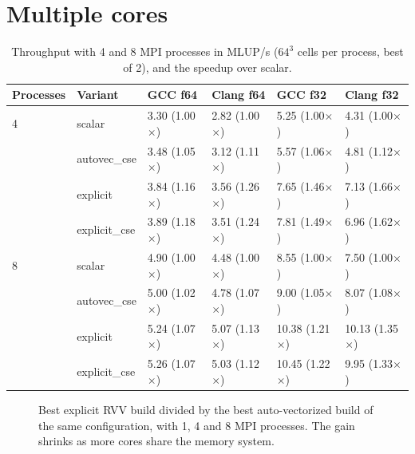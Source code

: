 \section{Multiple cores}\label{r02:sec:results-multi}

\begin{table}[htbp]
  \centering\small
  \caption{Throughput with 4 and 8 MPI processes in MLUP/s ($64^3$ cells per process,
    best of 2), and the speedup over scalar.}\label{r02:tab:multi}
  \begin{tabular}{@{}llllll@{}}
    \toprule
    \textbf{Processes} & \textbf{Variant} & \textbf{GCC f64} & \textbf{Clang f64} & \textbf{GCC f32} & \textbf{Clang f32}\\
    \midrule
    4 & scalar        & 3.30 (1.00$\times$) & 2.82 (1.00$\times$) & 5.25 (1.00$\times$) & 4.31 (1.00$\times$)\\
      & autovec\_cse  & 3.48 (1.05$\times$) & 3.12 (1.11$\times$) & 5.57 (1.06$\times$) & 4.81 (1.12$\times$)\\
      & explicit      & 3.84 (1.16$\times$) & 3.56 (1.26$\times$) & 7.65 (1.46$\times$) & 7.13 (1.66$\times$)\\
      & explicit\_cse & 3.89 (1.18$\times$) & 3.51 (1.24$\times$) & 7.81 (1.49$\times$) & 6.96 (1.62$\times$)\\
    \midrule
    8 & scalar        & 4.90 (1.00$\times$) & 4.48 (1.00$\times$) & 8.55 (1.00$\times$) & 7.50 (1.00$\times$)\\
      & autovec\_cse  & 5.00 (1.02$\times$) & 4.78 (1.07$\times$) & 9.00 (1.05$\times$) & 8.07 (1.08$\times$)\\
      & explicit      & 5.24 (1.07$\times$) & 5.07 (1.13$\times$) & 10.38 (1.21$\times$) & 10.13 (1.35$\times$)\\
      & explicit\_cse & 5.26 (1.07$\times$) & 5.03 (1.12$\times$) & 10.45 (1.22$\times$) & 9.95 (1.33$\times$)\\
    \bottomrule
  \end{tabular}
\end{table}

\begin{figure}[htbp]
  \centering
  
  \caption[Speedup of explicit RVV over auto-vectorization]{Best explicit RVV build
    divided by the best auto-vectorized build of the same configuration, with 1, 4 and 8
    MPI processes. The gain shrinks as more cores share the memory system.}
  \label{r02:fig:speedup}
\end{figure}

